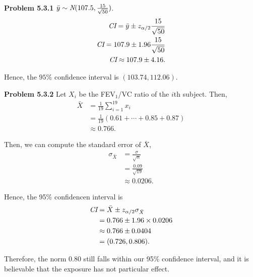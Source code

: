 \documentclass{article}
\begin{document}
\textbf{Problem 5.3.1}
$\bar{y} \sim \emph{N}(107.5, \frac{15}{\sqrt{50}})$. 
\begin{align}
    \emph{CI} = \bar{y} \pm z_{\alpha/2} \frac{15}{\sqrt{50}} \nonumber \\
    \emph{CI} = 107.9 \pm 1.96 \frac{15}{\sqrt{50}} \nonumber \\
    \emph{CI} \approx 107.9 \pm 4.16. \nonumber 
\end{align}

Hence, the $95\%$ confidence interval is $(103.74, 112.06)$.
\bigbreak

\textbf{Problem 5.3.2}
Let $X_i$ be the FEV$_1$/VC ratio of the $i$th subject. Then,
\begin{align}
    \bar{X} & = \frac{1}{19}\sum_{i = 1}^{19}x_i \nonumber \\
    & = \frac{1}{19} (0.61 + \cdots + 0.85 + 0.87) \nonumber \\ 
    & \approx 0.766. \nonumber
\end{align}
    
Then, we can compute the standard error of $\bar{X}$,
\begin{align}
    \sigma_{\bar{X}} & = \frac{\sigma}{\sqrt{n}} \nonumber \\
    & = \frac{0.09}{\sqrt{19}} \nonumber \\
    & \approx 0.0206. \nonumber
\end{align}

Hence, the 95\% confidencen interval is
\begin{align}
    \emph{CI} & = \bar{X} \pm z_{\alpha/2} \sigma_{\bar{X}} \nonumber \\
    & = 0.766 \pm 1.96 \times 0.0206 \nonumber \\
    & \approx 0.766 \pm 0.0404 \nonumber \\
    & = (0.726, 0.806). \nonumber
\end{align}

Therefore, the norm 0.80 still falls within our 95\% confidence interval, and it is believable that the exposure has not particular effect.
\end{document}
